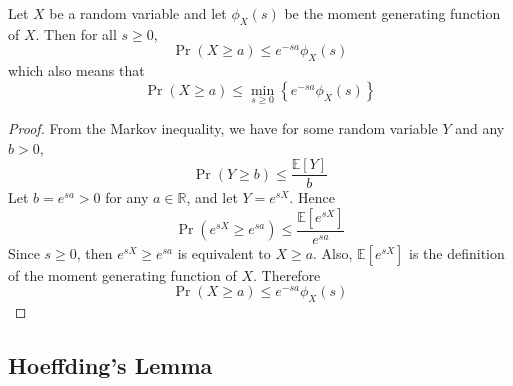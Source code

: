 \documentclass[11pt]{report} %
\begin{document}
Let $X$ be a random variable and let $\phi_{X}\left(s\right)$ be the moment generating function of $X$. Then for all $s\geq 0$, 
\begin{equation}
\operatorname{Pr}\left(X \geq a\right) \leq e^{-sa}\phi_{X}\left(s\right)
\end{equation}
which also means that 
\begin{equation}
\operatorname{Pr}\left(X \geq a\right) \leq \min_{s\geq 0}\left\{e^{-sa}\phi_{X}\left(s\right)\right\}
\end{equation}
\begin{proof}
From the Markov inequality, we have for some random variable $Y$ and any $b > 0$, 
\begin{equation}
\operatorname{Pr}\left(Y \geq b\right) \leq \dfrac{\mathbb{E}\left[Y\right]}{b}
\end{equation}
Let $b = e^{sa} > 0$ for any $a\in\mathbb{R}$, and let $Y = e^{sX}$. Hence
\begin{equation}
\operatorname{Pr}\left(e^{sX} \geq e^{sa}\right) \leq \dfrac{\mathbb{E}\left[e^{sX}\right]}{e^{sa}}
\end{equation}
Since $s\geq 0$, then $e^{sX} \geq e^{sa}$ is equivalent to $X \geq a$. Also, $\mathbb{E}\left[e^{sX}\right]$ is the definition of the moment generating function of $X$. Therefore
\begin{equation}
\operatorname{Pr}\left(X \geq a\right) \leq e^{-sa}\phi_{X}\left(s\right)
\end{equation}
\end{proof}

\subsection{Hoeffding's Lemma}
\end{document}

